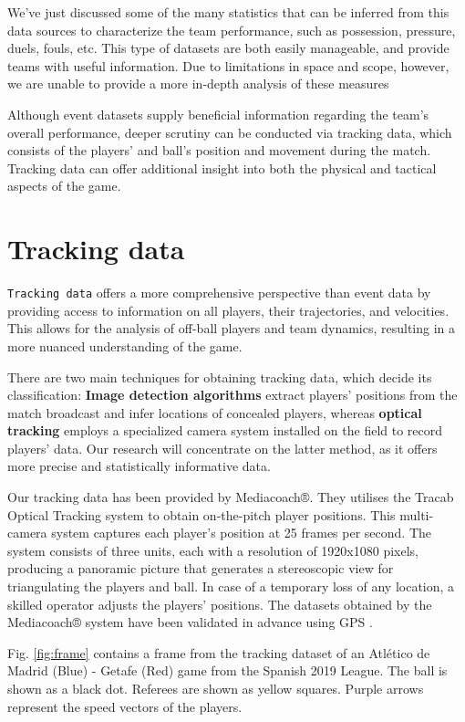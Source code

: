 \documentclass[
  twoside,nohyper]{book}
\begin{document}
We've just discussed some of the many statistics that can be inferred from this data sources to characterize the team performance, such as possession, pressure, duels, fouls, etc. This type of datasets are both easily manageable, and provide teams with useful information. Due to limitations in space and scope, however, we are unable to provide a more in-depth analysis of these measures

Although event datasets supply beneficial information regarding the team's overall performance, deeper scrutiny can be conducted via tracking data, which consists of the players' and ball's position and movement during the match. Tracking data can offer additional insight into both the physical and tactical aspects of the game.

\section{Tracking data}\label{tracking-data}

\texttt{Tracking\ data} offers a more comprehensive perspective than event data by providing access to information on all players, their trajectories, and velocities. This allows for the analysis of off-ball players and team dynamics, resulting in a more nuanced understanding of the game.

There are two main techniques for obtaining tracking data, which decide its classification: \textbf{Image detection algorithms} extract players' positions from the match broadcast and infer locations of concealed players, whereas \textbf{optical tracking} employs a specialized camera system installed on the field to record players' data. Our research will concentrate on the latter method, as it offers more precise and statistically informative data.

Our tracking data has been provided by Mediacoach®. They utilises the Tracab Optical Tracking system to obtain on-the-pitch player positions. This multi-camera system captures each player's position at 25 frames per second. The system consists of three units, each with a resolution of 1920x1080 pixels, producing a panoramic picture that generates a stereoscopic view for triangulating the players and ball. In case of a temporary loss of any location, a skilled operator adjusts the players' positions. The datasets obtained by the Mediacoach® system have been validated in advance using GPS \citep{Felipe2019ValidationOA}.

Fig. \ref{fig:frame} contains a frame from the tracking dataset of an Atlético de Madrid (Blue) - Getafe (Red) game from the Spanish 2019 League. The ball is shown as a black dot. Referees are shown as yellow squares. Purple arrows represent the speed vectors of the players.
\end{document}

